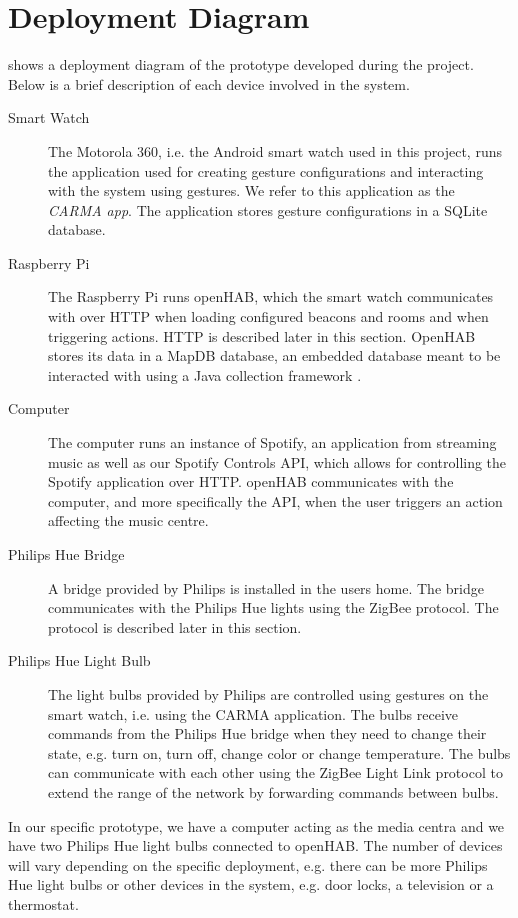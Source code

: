 \section{Deployment Diagram}

 shows a deployment diagram of the prototype developed during the project. Below is a brief description of each device involved in the system.

\begin{description}
\item[Smart Watch] The Motorola 360, i.e. the Android smart watch used in this project, runs the application used for creating gesture configurations and interacting with the system using gestures. We refer to this application as the \emph{CARMA app}. The application stores gesture configurations in a SQLite database.
\item[Raspberry Pi] The Raspberry Pi runs openHAB, which the smart watch communicates with over HTTP when loading configured beacons and rooms and when triggering actions. HTTP is described later in this section. OpenHAB stores its data in a MapDB database, an embedded database meant to be interacted with using a Java collection framework \cite{mapdb:mapdb}.
\item[Computer] The computer runs an instance of Spotify, an application from streaming music as well as our Spotify Controls API, which allows for controlling the Spotify application over HTTP. openHAB communicates with the computer, and more specifically the API, when the user triggers an action affecting the music centre.
\item[Philips Hue Bridge] A bridge provided by Philips is installed in the users home. The bridge communicates with the Philips Hue lights using the ZigBee protocol. The protocol is described later in this section.
\item[Philips Hue Light Bulb] The light bulbs provided by Philips are controlled using gestures on the smart watch, i.e. using the CARMA application. The bulbs receive commands from the Philips Hue bridge when they need to change their state, e.g. turn on, turn off, change color or change temperature. The bulbs can communicate with each other using the ZigBee Light Link protocol to extend the range of the network by forwarding commands between bulbs.
\end{description}

In our specific prototype, we have a computer acting as the media centra and we have two Philips Hue light bulbs connected to openHAB. The number of devices will vary depending on the specific deployment, e.g. there can be more Philips Hue light bulbs or other devices in the system, e.g. door locks, a television or a thermostat.

